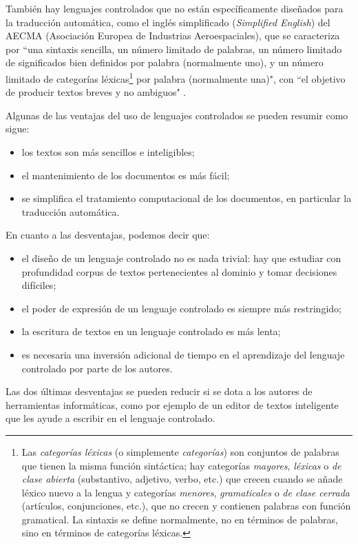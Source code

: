 También hay lenguajes controlados que no están específicamente diseñados para la traducción automática, como el inglés simplificado ({\em Simplified English}) del AECMA (Asociación Europea de Industrias Aeroespaciales), que se caracteriza por ``una sintaxis sencilla, un número limitado de palabras, un número limitado de significados bien definidos por palabra (normalmente uno), y un número limitado de categorías léxicas\footnote{Las \emph{categorías léxicas} (o simplemente \emph{categorías}) son conjuntos de palabras que tienen la misma función sintáctica; hay categorías \emph{mayores}, \emph{léxicas} o \emph{de clase abierta} (substantivo, adjetivo, verbo, etc.) que crecen cuando se añade léxico nuevo a la lengua y categorías \emph{menores}, \emph{gramaticales} o \emph{de clase cerrada} (artículos, conjunciones, etc.), que no crecen y contienen palabras con función gramatical. La sintaxis se define normalmente, no en términos de palabras, sino en términos de categorías léxicas.}\label{pg:catgra} por palabra (normalmente una)", con ``el objetivo de producir textos breves y no ambiguos" \citep{AECMA07u}. 

Algunas de las ventajas del uso de lenguajes controlados \citep{schwitten07uno} se pueden resumir como sigue: \begin{itemize} \item los textos son más sencillos e inteligibles; \item el mantenimiento de los documentos es más fácil; \item se simplifica el tratamiento computacional de los documentos, en particular la traducción automática. \end{itemize} En cuanto a las desventajas, podemos decir que: \begin{itemize} \item el diseño de un lenguaje controlado no es nada trivial: hay que estudiar con profundidad corpus de textos pertenecientes al dominio y tomar decisiones difíciles; \item el poder de expresión de un lenguaje controlado es siempre más restringido; \item la escritura de textos en un lenguaje controlado es más lenta; \item es necesaria una inversión adicional de tiempo en el aprendizaje del lenguaje controlado por parte de los autores. \end{itemize} Las dos últimas desventajas se pueden reducir si se dota a los autores de herramientas informáticas, como por ejemplo de un editor de textos inteligente que les ayude a escribir en el lenguaje controlado. 

